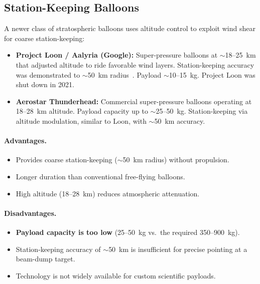 \documentclass[11pt]{article}
\begin{document}
\subsection{Station-Keeping Balloons}
\label{sec:stationkeeping}

A newer class of stratospheric balloons uses altitude control to
exploit wind shear for coarse station-keeping:

\begin{itemize}[nosep]
  \item \textbf{Project Loon / Aalyria (Google):} Super-pressure balloons at
        $\sim$18--25~km that adjusted altitude to ride favorable wind layers.
        Station-keeping accuracy was demonstrated to $\sim$50~km
        radius~\cite{Loon-Nature}.  Payload $\sim$10--15~kg.
        Project Loon was shut down in 2021.
  \item \textbf{Aerostar Thunderhead:} Commercial super-pressure balloons
        operating at 18--28~km altitude.  Payload capacity up to
        $\sim$25--50~kg.  Station-keeping via altitude modulation,
        similar to Loon, with $\sim$50~km accuracy.
\end{itemize}

\paragraph{Advantages.}
\begin{itemize}[nosep]
  \item Provides coarse station-keeping ($\sim$50~km radius) without
        propulsion.
  \item Longer duration than conventional free-flying balloons.
  \item High altitude (18--28~km) reduces atmospheric attenuation.
\end{itemize}

\paragraph{Disadvantages.}
\begin{itemize}[nosep]
  \item \textbf{Payload capacity is too low} (25--50~kg vs.\ the required
        350--900~kg).
  \item Station-keeping accuracy of $\sim$50~km is insufficient for
        precise pointing at a beam-dump target.
  \item Technology is not widely available for custom scientific payloads.
\end{itemize}
\end{document}
